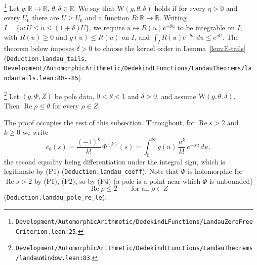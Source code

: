 \begin{definition}\label{def:E-windowU}
\footnote{\nolinkurl{Development/AutomorphicArithmetic/DedekindLFunctions/LandauZeroFreeCriterion.lean:25}.}%
Let $g:\mathbb R\to\mathbb R$, $\theta,\delta\in\mathbb R$. We say that
$\mathrm{W}(g,\theta,\delta)$ holds if for every $\eta>0$ and every $U_0$ there are $U\ge U_0$ and a
function $R:\mathbb R\to\mathbb R$. Writing $I=\{u:U\le u\le(1+\delta)U\}$, we require
$u\mapsto R(u)e^{-\theta u}$ to be integrable on $I$, with $R(u)\ge0$ and $g(u)\le R(u)$
on $I$, and $\int_I R(u)e^{-\theta u}\,du\le e^{\eta U}$.
The theorem below imposes $\delta>0$ to choose the kernel order in Lemma~\ref{lem:E-tails}
(\texttt{Deduction.landau\_tails}, \nolinkurl{Development/AutomorphicArithmetic/DedekindLFunctions/LandauTheorems/landauTails.lean:80--85}).
\end{definition}

\begin{theorem}\label{thm:E-landau-window}
\footnote{\nolinkurl{Development/AutomorphicArithmetic/DedekindLFunctions/LandauTheorems/landauWindow.lean:83}.}%
Let $(g,\Phi,Z)$ be pole data, $0<\theta<1$ and $\delta>0$, and assume
$\mathrm{W}(g,\theta,\delta)$. Then $\operatorname{Re}\rho\le\theta$ for every $\rho\in Z$.
\end{theorem}

The proof occupies the rest of this subsection. Throughout, for $\operatorname{Re}s>2$ and
$k\ge0$ we write
\[
c_k(s)=\frac{(-1)^{k}}{k!}\,\Phi^{(k)}(s)=\int_0^\infty g(u)\,\frac{u^{k}}{k!}\,e^{-su}\,du ,
\]
the second equality being differentiation under the integral sign, which is legitimate by (P1)
(\texttt{Deduction.landau\_coeff}). Note that $\Phi$ is holomorphic for $\operatorname{Re}s>2$ by
(P1), (P2), so by (P4) (a pole is a point near which $\Phi$ is unbounded)
\begin{equation}\label{eq:E-poles-left}
\operatorname{Re}\rho\le2\qquad\text{for all }\rho\in Z
\end{equation}
(\texttt{Deduction.landau\_pole\_re\_le}).

